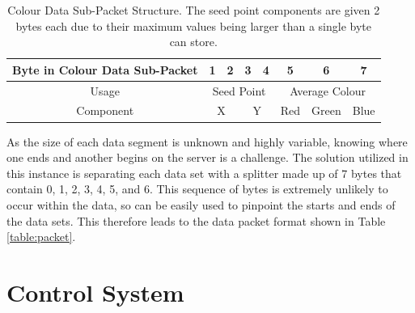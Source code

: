 \begin{table}[H]
\centering
\caption{Colour Data Sub-Packet Structure. The seed point components are given 2 bytes each due to their maximum values being larger than a single byte can store.}
\label{table:colour}
\begin{tabular}{|c|c|c|c|c|c|c|c|}
\hline
Byte in Colour Data Sub-Packet & 1          & 2         & 3          & 4         & 5         & 6           & 7         \\ \hline
Usage                          & \multicolumn{4}{c|}{Seed Point}                 & \multicolumn{3}{c|}{Average Colour} \\ \hline
Component                      & \multicolumn{2}{c|}{X} & \multicolumn{2}{c|}{Y} & Red       & Green       & Blue      \\ \hline
\end{tabular}
\end{table}

As the size of each data segment is unknown and highly variable, knowing where one ends and another begins on the server is a challenge. The solution utilized in this instance is separating each data set with a splitter made up of 7 bytes that contain 0, 1, 2, 3, 4, 5, and 6. This sequence of bytes is extremely unlikely to occur within the data, so can be easily used to pinpoint the starts and ends of the data sets. This therefore leads to the data packet format shown in Table \ref{table:packet}.

\begin{table}[H]
\centering
\caption{Data Packet Format.}
\label{table:packet}
\end{table}

\section{Control System}



